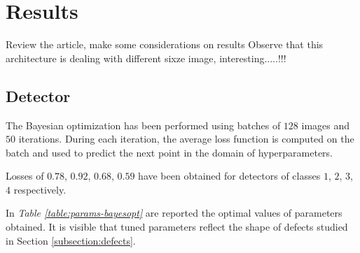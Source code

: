 \section{Results}\label{section:results}
    Review the article, make some considerations on results
    Observe that this architecture is dealing with different sixze image, interesting.....!!!

    \subsection{Detector}
    \label{sec:results-detector}
    \par{
    	The Bayesian optimization has been performed using batches of $128$ images and $50$ iterations. During each iteration, the average loss function is computed on the batch and used to predict the next point in the domain of hyperparameters. 
    }	
   	\par{
    	Losses of $0.78$, $0.92$, $0.68$, $0.59$ have been obtained for detectors of classes $1$, $2$, $3$, $4$ respectively.
    }
	\par{
		In \emph{Table \ref{table:params-bayesopt}} are reported the optimal values of parameters obtained. It is visible that tuned parameters reflect the shape of defects studied in Section \ref{subsection:defects}.
	}	
